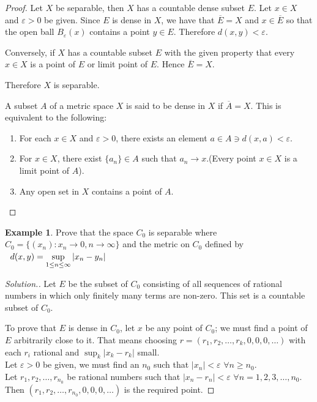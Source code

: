 \documentclass[11pt,a4paper]{article}
\theoremstyle{definition}
\newtheorem{exa}[thm]{Example}
\newenvironment{solution}
  {\renewcommand{\qedsymbol}{}\begin{proof}[\textit{Solution}.]}
  {\end{proof}}
\begin{document}
\begin{proof}
Let $X$ be separable, then $X$ has a countable dense subset $E$. Let $x\in X$ and $\varepsilon>0$ be given. Since $E$ is dense in $X$, we have that $\overline{E}=X$ and $x\in \overline{E}$ so that the open ball $B_{\varepsilon}(x)$ contains a point $y\in E$. Therefore $d(x,y)<\varepsilon$.

Conversely, if $X$ has a countable subset $E$ with the given property that every $x\in X$ is a point of $E$ or limit point of $E$. Hence $\overline{E}=X$.

Therefore $X$ is separable.


A subset $A$ of a metric space $X$ is said to be dense in $X$ if $\overline{A}=X$. This is equivalent to the following:
\begin{enumerate}
\item[i] For each $x\in X$ and $\varepsilon>0$, there exists an element $a\in A\ni d(x,a)<\varepsilon$.
\item[ii] For $x\in X$, there exist $\{a_n\}\in A$ such that $a_n\rightarrow x$.(Every point $x\in X$ is a limit point of $A$).
\item[iii] Any open set in $X$ contains a point of $A$.
\end{enumerate} 
\end{proof}


\begin{exa}
Prove that the space $C_0$ is separable where $C_0=\{(x_n):x_n\rightarrow 0, n\rightarrow \infty \}$ and the metric on $C_0$ defined by $\hspace{0.2cm}\displaystyle{ d(x,y)=\sup_{1\leq n\leq \infty}|x_n-y_n|}$

\end{exa}


\begin{solution}
Let $E$ be the subset of $C_0$ consisting of all sequences of rational numbers in which only finitely many terms are non-zero. This set is a countable subset of $C_0$.

To prove that $E$ is dense in $C_0$, let $x$ be any point of $C_0$; we must find a point of $E$ arbitrarily close to it. That means choosing $r=(r_1,r_2,\dots,r_k,0,0,0,\dots)$ with each $r_i$ rational and $\sup_k|x_k-r_k|$ small.\\ Let $\varepsilon>0$ be given, we must find an $n_0$ such that $|x_n|<\varepsilon$ $\forall n\geq n_0$.\\ Let $r_1,r_2,\dots,r_{n_0}$ be rational numbers such that $|x_n-r_n|<\varepsilon$ \hspace{0.2cm}$\forall n=1,2,3,\dots,n_0$. Then $(r_1,r_2,\dots,r_{n_0},0,0,0,\dots)$ is the required point.


\end{solution}
\end{document}
